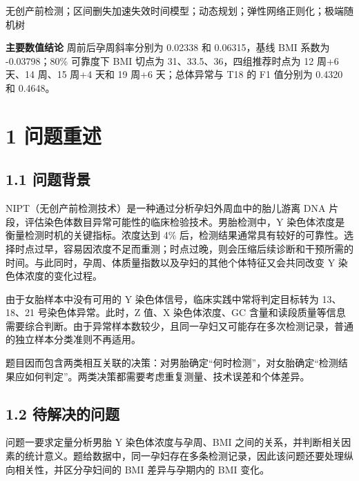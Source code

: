 \documentclass[UTF8,fontset=fandol,zihao=-4,a4paper]{ctexart}
\begin{document}
\vspace{0.7em}
无创产前检测；区间删失加速失效时间模型；动态规划；弹性网络正则化；极端随机树

\vfill
\begin{center}
\begin{minipage}{0.90\textwidth}
\small
\textbf{主要数值结论} 周前后孕周斜率分别为 0.02338 和 0.06315，基线 BMI 系数为 -0.03798；80\% 可靠度下 BMI 切点为 31、33.5、36，四组推荐时点为 12 周+6 天、14 周、15 周+4 天和 19 周+6 天；总体异常与 T18 的 F1 值分别为 0.4320 和 0.4648。
\end{minipage}
\end{center}

\clearpage
{}

\section{1 问题重述}\label{ux95eeux9898ux91cdux8ff0}

\subsection{1.1 问题背景}\label{ux95eeux9898ux80ccux666f}

NIPT（无创产前检测技术）是一种通过分析孕妇外周血中的胎儿游离 DNA
片段，评估染色体数目异常可能性的临床检验技术。男胎检测中，Y
染色体浓度是衡量检测时机的关键指标。浓度达到 4\%
后，检测结果通常具有较好的可靠性。选择时点过早，容易因浓度不足而重测；时点过晚，则会压缩后续诊断和干预所需的时间。与此同时，孕周、体质量指数以及孕妇的其他个体特征又会共同改变
Y 染色体浓度的变化过程。

由于女胎样本中没有可用的 Y 染色体信号，临床实践中常将判定目标转为 13、18、21
号染色体异常。此时，Z 值、X 染色体浓度、GC
含量和读段质量等信息需要综合判断。由于异常样本数较少，且同一孕妇又可能存在多次检测记录，普通的独立样本分类准则不再适用。

题目因而包含两类相互关联的决策：对男胎确定``何时检测''，对女胎确定``检测结果应如何判定''。两类决策都需要考虑重复测量、技术误差和个体差异。

\subsection{1.2
待解决的问题}\label{ux5f85ux89e3ux51b3ux7684ux95eeux9898}

问题一要求定量分析男胎 Y 染色体浓度与孕周、BMI
之间的关系，并判断相关因素的统计意义。题给数据中，同一孕妇存在多条检测记录，因此该问题还要处理纵向相关性，并区分孕妇间的
BMI 差异与孕期内的 BMI 变化。
\end{document}

